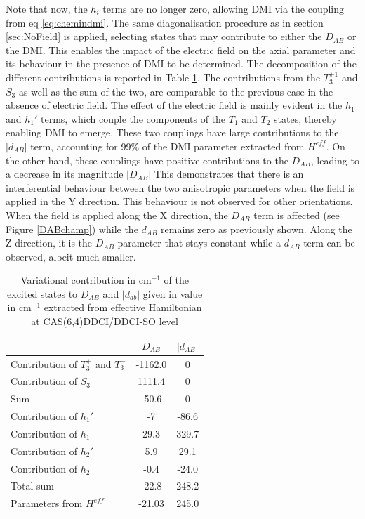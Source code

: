 \documentclass[10pt]{report}
\numberwithin{equation}{section}
\begin{document}
Note that now, the $h_i$ terms are no longer zero, allowing DMI via the coupling from eq \ref{eq:chemindmi}.
The same diagonalisation procedure as in section \ref{sec:NoField} is applied, selecting states that may contribute to either the $D_{AB}$ or the DMI.
This enables the impact of the electric field on the axial parameter and its behaviour in the presence of DMI to be determined.
The decomposition of the different contributions is reported in Table \ref{tab:decompfield}.
The contributions from the $T_3^{\pm1}$ and $S_3$ as well as the sum of the two, are comparable to the previous case in the absence of electric field.
The effect of the electric field is mainly evident in the $h_1$ and $h_1'$ terms, which couple the components of the $T_1$ and $T_2$ states, thereby enabling DMI to emerge.
These two couplings have large contributions to the $|d_{AB}|$ term, accounting for 99\% of the DMI parameter extracted from $H^{eff}$.
On the other hand, these couplings have positive contributions to the $D_{AB}$, leading to a decrease in its magnitude $|D_{AB}|$
This demonstrates that there is an interferential behaviour between the two anisotropic parameters when the field is applied in the Y direction.
This behaviour is not observed for other orientations. 
When the field is applied along the X direction, the $D_{AB}$ term is affected (see Figure \ref{DABchamp}) while the $d_{AB}$ remains zero as previously shown.
Along the Z direction, it is the $D_{AB}$ parameter that stays constant while a $d_{AB}$ term can be observed, albeit much smaller.

\begin{table}
    \centering
    \begin{tabular}{l c c}
        \hline
        \hline
         & $D_{AB}$ & $|d_{AB}|$\\
         \hline
         Contribution of $T_3^+$ and $T_3^-$& -1162.0& 0 \\
         Contribution of $S_3$& 1111.4 & 0\\
         Sum & -50.6 &0\\
         Contribution of $h_1'$ & -7 & -86.6\\
         Contribution of $h_1$& 29.3 & 329.7\\
         Contribution of $h_2'$& 5.9 & 29.1\\
         Contribution of $h_2$ & -0.4 & -24.0\\
         Total sum & -22.8  & 248.2\\
         Parameters from $H^{eff}$ & -21.03 & 245.0\\
         \hline
         \hline
    \end{tabular}
    \caption{Variational contribution in cm$^{-1}$ of the excited states to $D_{AB}$ and $|d_{ab}|$ given in value in cm$^{-1}$ extracted from effective Hamiltonian at CAS(6,4)DDCI/DDCI-SO level}
    \label{tab:decompfield}
\end{table}
\end{document}
